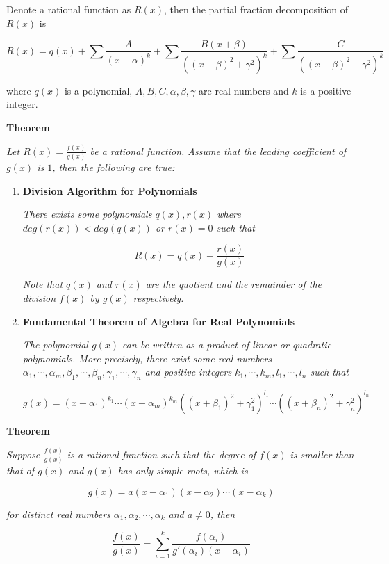 \documentclass[a4paper,12pt]{article}
\newcommand{\s}{\vspace{1mm}}
\newcommand{\n}{\vspace{3mm}}
\newenvironment{block}[4][Block]{ %
\begin{list}{}{
  \setlength{\leftmargin}{0mm}
  \setlength{\rightmargin}{0mm}
  \setlength{\topsep}{0mm}
  \setlength{\partopsep}{0mm}
  \parsep\parskip
  \setlength{\itemsep}{-\parsep}
  }
  \needspace{\baselineskip}
  \item \textbf{#2 #3} \hspace{1mm} #4
  \vspace{1mm}
  \item
  }
{
\end{list}
}
\newenvironment{alist}{ %
\begin{enumerate}[label=(\alph*)]
}{
\end{enumerate}
}
\begin{document}
Denote a rational function as $R(x)$, then the partial fraction decomposition of $R(x)$ is

$$R(x)=q(x)+\sum\frac{A}{(x-\alpha)^{k}}+\sum\frac{B(x+\beta)}{((x-\beta)^{2}+\gamma^{2})^{k}}+\sum\frac{C}{((x-\beta)^{2}+\gamma^{2})^{k}}$$\s

where $q(x)$ is a polynomial, $A,B,C,\alpha,\beta,\gamma$ are real numbers and $k$ is a positive integer.\n

\begin{block}{Theorem}{}{}
  \textit{Let $R(x)=\frac{f(x)}{g(x)}$ be a rational function. Assume that the leading coefficient of $g(x)$ is $1$, then the following are true:}

  \begin{alist}
    \item \textbf{Division Algorithm for Polynomials}\n

    \textit{There exists some polynomials $q(x),r(x)$ where $deg(r(x))<deg(q(x))$ or $r(x)=0$ such that}

    $$R(x)=q(x)+\frac{r(x)}{g(x)}$$\s

    \textit{Note that $q(x)$ and $r(x)$ are the quotient and the remainder of the division $f(x)$ by $g(x)$ respectively.}

    \item \textbf{Fundamental Theorem of Algebra for Real Polynomials}\n

    \textit{The polynomial $g(x)$ can be written as a product of linear or quadratic polynomials. More precisely, there exist some real numbers $\alpha_{1},\cdots,\alpha_{m},\beta_{1},\cdots,\beta_{n},\gamma_{1},\cdots,\gamma_{n}$ and positive integers $k_{1},\cdots,k_{m},l_{1},\cdots,l_{n}$ such that}

    $$g(x)=(x-\alpha_{1})^{k_{1}}\cdots(x-\alpha_{m})^{k_{m}}((x+\beta_{1})^{2}+\gamma_{1}^{2})^{l_{1}}\cdots((x+\beta_{n})^{2}+\gamma_{n}^{2})^{l_{n}}$$
  \end{alist}
\end{block}\n

\begin{block}{Theorem}{}{}
  \textit{Suppose $\frac{f(x)}{g(x)}$ is a rational function such that the degree of $f(x)$ is smaller than that of $g(x)$ and $g(x)$ has only simple roots, which is}

  $$g(x)=a(x-\alpha_{1})(x-\alpha_{2})\cdots(x-\alpha_{k})$$\s

  \textit{for distinct real numbers $\alpha_{1},\alpha_{2},\cdots,\alpha_{k}$ and $a\neq 0$, then}

  $$\frac{f(x)}{g(x)}=\sum_{i=1}^{k}\frac{f(\alpha_{i})}{g'(\alpha_{i})(x-\alpha_{i})}$$
\end{block}

\pagebreak
\end{document}

